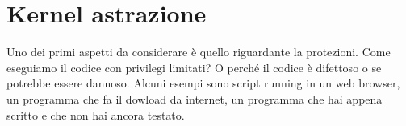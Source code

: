 \section{Kernel astrazione}
Uno dei primi aspetti da considerare è quello riguardante la protezioni. 
Come eseguiamo il codice con privilegi limitati? O perché il codice è difettoso o se potrebbe essere dannoso.
Alcuni esempi sono script running in un web browser, un programma che fa il dowload da internet, un programma che hai appena scritto e che non hai ancora testato.


